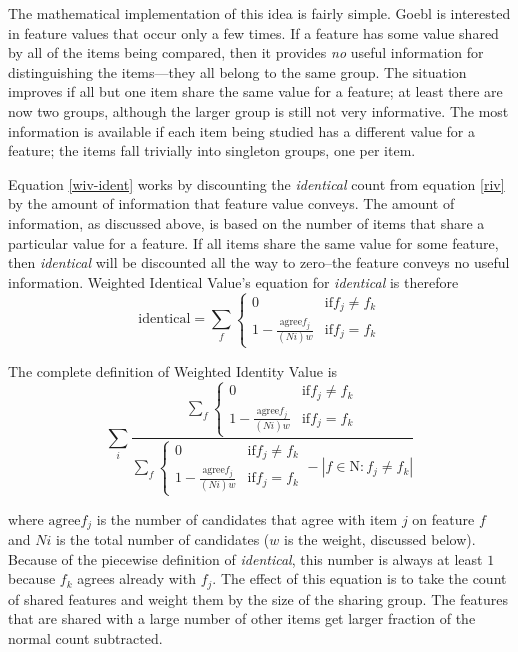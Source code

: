 \documentclass[11pt]{article}
\begin{document}
The mathematical implementation of this idea is fairly simple. Goebl
is interested in feature values that occur only a few times.  If a
feature has some value shared by all of the items being compared, then
it provides {\it no} useful information for distinguishing the
items---they all belong to the same group.  The situation improves if
all but one item share the same value for a feature; at least there
are now two groups, although the larger group is still not very
informative.  The most information is available if each item being
studied has a different value for a feature; the items fall trivially
into singleton groups, one per item.

Equation \ref{wiv-ident} works by discounting
the \textit{identical} count from equation \ref{riv} by
the amount of information that feature value conveys. The
amount of information, as discussed above, is based on the number of
items that share a particular value for a feature. If all items share
the same value for some feature, then \textit{identical} will be discounted all the
way to zero--the feature conveys no useful information.
Weighted Identical Value's equation for \textit{identical} is
therefore
\begin{equation}
  \textrm{identical} = \sum_f \left\{
  \begin{array}{ll}
    0 & \textrm{if} f_j \neq f_k \\
    1 - \frac{\textrm{agree}f_{j}}{(Ni)w} & \textrm{if} f_j = f_k
  \end{array} \right.
\label{wiv-ident}
\end{equation}

\noindent{}The complete definition of Weighted Identity Value is
\begin{equation} \sum_i \frac{\sum_f \left\{
  \begin{array}{ll}
    0 & \textrm{if} f_j \neq f_k \\
    1 - \frac{\textrm{agree}f_j} {(Ni)w} & \textrm{if} f_j = f_k
\end{array} \right.}
  {\sum_f \left\{
  \begin{array}{ll}
    0 & \textrm{if} f_j \neq f_k \\
    1 - \frac{\textrm{agree}f_j} {(Ni)w} & \textrm{if} f_j = f_k
    \end{array} \right. - |f \in \textrm{N} : f_j \neq f_k|}
  \label{wiv-full}
  \end{equation}

  \noindent{}where $\textrm{agree}f_{j}$ is the number of candidates that agree
  with item $j$ on feature $f$ and $Ni$ is the total number of
  candidates ($w$ is the weight, discussed below). Because of the
  piecewise definition of \textit{identical}, this number is always at
  least $1$ because $f_k$ agrees already with $f_j$. The effect of
  this equation is to take the count of shared features and weight
  them by the size of the sharing group. The features that are shared
  with a large number of other items get larger fraction of the normal
  count subtracted.
\end{document}
